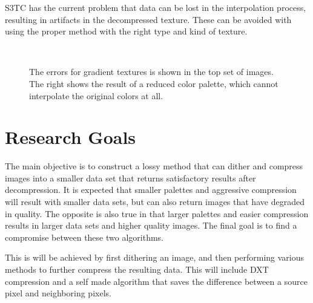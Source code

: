\documentclass[12pt]{article}
\begin{document}
S3TC has the current problem that data can be lost in the interpolation process, resulting in artifacts in the decompressed texture. These can be avoided with using the proper method with the right type and kind of texture. \citep{Iourcha1999}

\begin{figure}[!htbp]
\begin{center}
\\
\end{center}
\caption{The errors for gradient textures is shown in the top set of images. The right shows the result of a reduced color palette, which cannot interpolate the original colors at all.}
\end{figure}

\section{Research Goals}

The main objective is to construct a lossy method that can dither and compress images into a smaller data set that returns satisfactory results after decompression. It is expected that smaller palettes and aggressive compression will result with smaller data sets, but can also return images that have degraded in quality. The opposite is also true in that larger palettes and easier compression results in larger data sets and higher quality images. The final goal is to find a compromise between these two algorithms.

This is will be achieved by first dithering an image, and then performing various methods to further compress the resulting data. This will include DXT compression and a self made algorithm that saves the difference between a source pixel and neighboring pixels.
\end{document}
